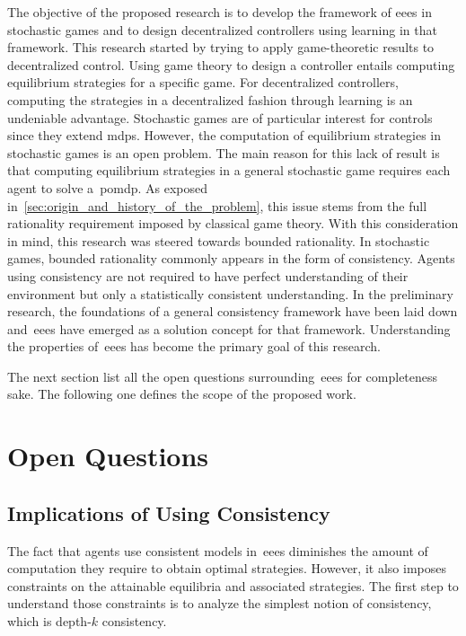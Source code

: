 The objective of the proposed research is to develop the framework of \acp{eee} in stochastic games and to design decentralized controllers using learning in that framework.
This research started by trying to apply game-theoretic results to decentralized control.
Using game theory to design a controller entails computing equilibrium strategies for a specific game.
For decentralized controllers, computing the strategies in a decentralized fashion through learning is an undeniable advantage.
Stochastic games are of particular interest for controls since they extend \acp{mdp}.
However, the computation of equilibrium strategies in stochastic games is an open problem.
The main reason for this lack of result is that computing equilibrium strategies in a general stochastic game requires each agent to solve a~\ac{pomdp}.
As exposed in~\cref{sec:origin_and_history_of_the_problem}, this issue stems from the full rationality requirement imposed by classical game theory.
With this consideration in mind, this research was steered towards bounded rationality.
In stochastic games, bounded rationality commonly appears in the form of consistency.
Agents using consistency are not required to have perfect understanding of their environment but only a statistically consistent understanding.
In the preliminary research, the foundations of a general consistency framework have been laid down and~\acp{eee} have emerged as a solution concept for that framework.
Understanding the properties of~\acp{eee} has become the primary goal of this research.

The next section list all the open questions surrounding~\acp{eee} for completeness sake.
The following one defines the scope of the proposed work.

\section{Open Questions}

\subsection{Implications of Using Consistency}
The fact that agents use consistent models in~\acp{eee} diminishes the amount of computation they require to obtain optimal strategies.
However, it also imposes constraints on the attainable equilibria and associated strategies.
The first step to understand those constraints is to analyze the simplest notion of consistency, which is depth-\(k\) consistency.

